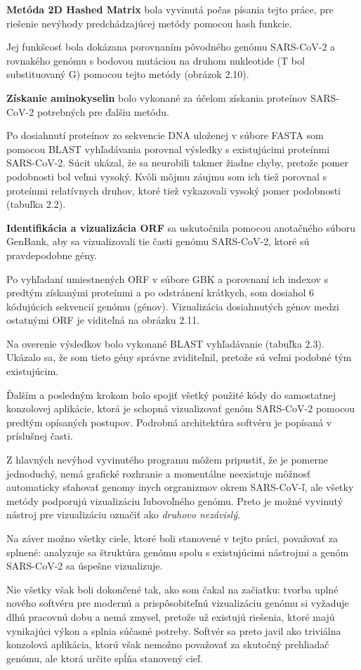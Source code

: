 \textbf{Metóda 2D Hashed Matrix } bola vyvinutá počas písania tejto práce, pre riešenie nevýhody predchádzajúcej metódy pomocou hash funkcie.

Jej funkšcosť bola dokázana porovnaním pôvodného genómu SARS-CoV-2 a rovnakého genómu s bodovou mutáciou na druhom nukleotide (T bol substituovaný G) pomocou tejto metódy (obrázok 2.10).

\textbf{Získanie aminokyselin} bolo vykonané za účelom získania proteínov SARS-CoV-2 potrebných pre ďalšiu metódu.

Po dosiahnutí proteínov zo sekvencie DNA uloženej v súbore FASTA som pomocou BLAST vyhľadávania porovnal výsledky s existujúcimi proteínmi SARS-CoV-2.
Súcit ukázal, že sa neurobili takmer žiadne chyby, pretože pomer podobnosti bol veľmi vysoký.
Kvôli môjmu záujmu som ich tiež porovnal s proteínmi relatívnych druhov, ktoré tiež vykazovali vysoký pomer podobnosti (tabuľka 2.2).

\textbf{Identifikácia a vizualizácia ORF} sa uskutočnila pomocou anotačného súboru GenBank, aby sa vizualizovali tie časti genómu SARS-CoV-2, ktoré sú pravdepodobne gény.

Po vyhľadaní umiestnených ORF v súbore GBK a porovnaní ich indexov s predtým získanými proteínmi a po odstránení krátkych, som dosiahol 6 kódujúcich sekvencií genómu (génov).
Vizualizácia dosiahnutých génov medzi ostatnými ORF je viditeľná na obrázku 2.11.

Na overenie výsledkov bolo vykonané BLAST vyhľadávanie (tabuľka 2.3).
Ukázalo sa, že som tieto gény správne zviditeľnil, pretože sú veľmi podobné tým existujúcim.

\smallskip

Ďalším a posledným krokom bolo spojiť všetký použité kódy do samostatnej konzolovej aplikácie, ktorá je schopná vizualizovať genóm SARS-CoV-2 pomocou predtým opísaných postupov.
Podrobná architektúra softvéru je popísaná v príslušnej časti.

Z hlavných nevýhod vyvinutého programu môžem pripustiť, že je pomerne jednoduchý, nemá grafické rozhranie a momentálne neexistuje môžnosť automaticky sťahovať genomy inych orgranizmov okrem SARS-CoV-ľ, ale všetky metódy podporujú vizualizáciu ľubovoľného genómu.
Preto je možné vyvinutý nástroj pre vizualizáciu označiť ako \textit{druhovo nezávislý}.

\smallskip
Na záver možno všetky ciele, ktoré boli stanovené v tejto práci, považovať za splnené: analyzuje sa štruktúra genómu spolu s existujúcimi nástrojmi a genóm SARS-CoV-2 sa úspešne vizualizuje.

Nie všetky však boli dokončené tak, ako som čakal na začiatku: tvorba uplné nového softvéru pre modernú a prispôsobiteľnú vizualizáciu genómu si vyžaduje dlhú pracovnú dobu a nemá zmysel, pretože už existujú riešenia, ktoré majú vynikajúci výkon a splnia súčasné potreby.
Softvér sa preto javil ako triviálna konzolová aplikácia, ktorú však nemožno považovať za skutočný prehliadač genómu, ale ktorá určite spĺňa stanovený cieľ.

\label{evaluation}